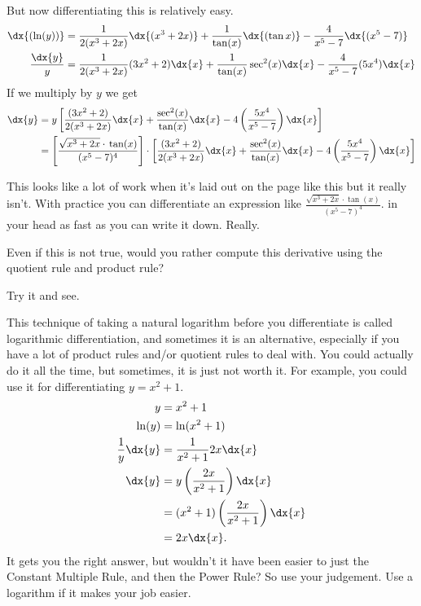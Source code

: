\begin{myexample}
But now differentiating this is relatively easy.
\begin{align*}
  \dx{(\ln(y))}&=
                 \frac{1}{2(x^3+2x)}\dx{(x^3+2x)}+\frac{1}{\tan(x)}\dx{(\tan{x})}-\frac{4}{x^5-7}\dx{(x^5-7)}\\
  \frac{\dx{y}}{y}&=
                    \frac{1}{2(x^3+2x)}(3x^2+2)\dx{x}+\frac{1}{\tan(x)}\sec^2(x)\dx{x}-\frac{4}{x^5-7}(5x^4)\dx{x}\\
\end{align*}
If we multiply by $y$ we get
\begin{align*}
  \dx{y}&=
          y\left[\frac{(3x^2+2)}{2(x^3+2x)}\dx{x}+\frac{\sec^2(x)}{\tan(x)}\dx{x}-4\left(\frac{5x^4}{x^5-7}\right)\dx{x}\right]\\
        &=        \left[\frac{\sqrt{x^3+2x}\cdot{}\tan(x)}{(x^5-7)^4}\right]\cdot\left[\frac{(3x^2+2)}{2(x^3+2x)}\dx{x}+\frac{\sec^2(x)}{\tan(x)}\dx{x}-4\left(\frac{5x^4}{x^5-7}\right)\dx{x}\right]\\
\end{align*}
\end{myexample}

\begin{ProficiencyDrill}
  This looks like a lot of work when it's laid out on the page like this
but it really isn't. With practice you can differentiate an expression
like 
$
\frac{\sqrt{x^3+2x}\cdot{}\tan(x)}{(x^5-7)^4}.
$ in your head  as fast as you can write it down. Really.

Even if this is not true,   would
you rather compute this derivative using the quotient rule and
product rule?

  Try it and see.
\end{ProficiencyDrill}

This technique of taking a natural logarithm before you
differentiate is called logarithmic differentiation, and sometimes it
is an alternative, especially if you have a lot of product rules
and/or quotient rules to deal with.  You could actually do it all the
time, but sometimes, it is just not worth it.  For example, you could
use it for differentiating $y=x^2+1.$ 
\begin{align*}
  y&=x^2+1\\
  \ln(y)&=\ln(x^2+1)\\
  \frac{1}{y} \dx{y}&=\frac{1}{x^2+1} 2x\dx{x}\\
  \dx{y}&=y\left(\frac{2x}{x^2+1}\right)\dx{x}\\
   &=(x^2+1)\left(\frac{2x}{x^2+1}\right)\dx{x}\\
   &=2x \dx{x}.
\end{align*}
It gets you the right answer, but wouldn't it have been easier to just
the Constant Multiple Rule, and then the Power Rule?  So use your
judgement.  Use a logarithm if it makes your job easier.

